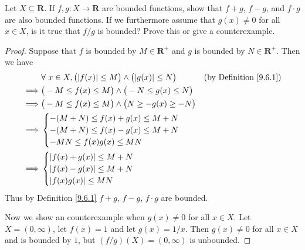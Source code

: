 \begin{exercise}\label{ex 9.6.2}
    Let \(X \subseteq \mathbf{R}\).
    If \(f, g: X \to \mathbf{R}\) are bounded functions, show that \(f + g\), \(f - g\), and \(f \cdot g\) are also bounded functions.
    If we furthermore assume that \(g(x) \neq 0\) for all \(x \in X\), is it true that \(f / g\) is bounded?
    Prove this or give a counterexample.
\end{exercise}

\begin{proof}
    Suppose that \(f\) is bounded by \(M \in \mathbf{R}^+\) and \(g\) is bounded by \(N \in \mathbf{R}^+\).
    Then we have
    \begin{align*}
                 & \forall\ x \in X, \big(\abs*{f(x)} \leq M\big) \land \big(\abs*{g(x)} \leq N\big) & \text{(by Definition \ref{9.6.1})} \\
        \implies & \big(-M \leq f(x) \leq M\big) \land \big(-N \leq g(x) \leq N\big)                                                      \\
        \implies & \big(-M \leq f(x) \leq M\big) \land \big(N \geq -g(x) \geq -N\big)                                                     \\
        \implies & \begin{cases}
            -(M + N) \leq f(x) + g(x) \leq M + N \\
            -(M + N) \leq f(x) - g(x) \leq M + N \\
            -MN \leq f(x) g(x) \leq MN
        \end{cases}                                                                                             \\
        \implies & \begin{cases}
            \abs*{f(x) + g(x)} \leq M + N \\
            \abs*{f(x) - g(x)} \leq M + N \\
            \abs*{f(x) g(x)} \leq MN
        \end{cases}
    \end{align*}
    Thus by Definition \ref{9.6.1} \(f + g\), \(f - g\), \(f \cdot g\) are bounded.

    Now we show an counterexample when \(g(x) \neq 0\) for all \(x \in X\).
    Let \(X = (0, \infty)\), let \(f(x) = 1\) and let \(g(x) = 1 / x\).
    Then \(g(x) \neq 0\) for all \(x \in X\) and is bounded by \(1\), but \((f / g)(X) = (0, \infty)\) is unbounded.
\end{proof}